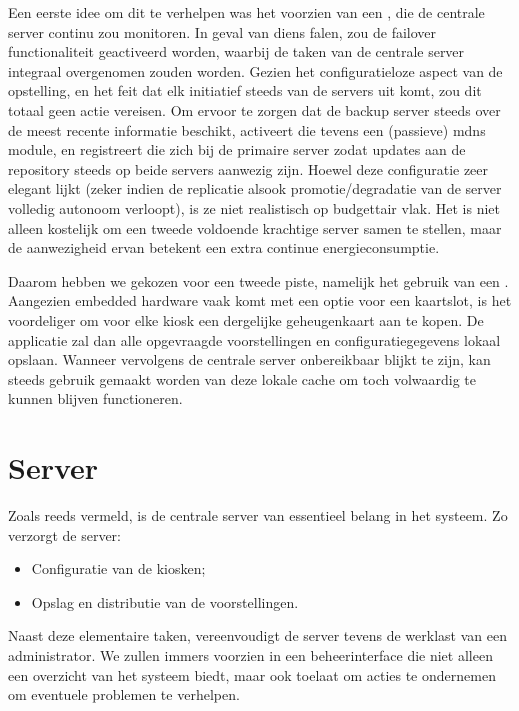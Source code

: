 Een eerste idee om dit te verhelpen was het voorzien van een , die de centrale server continu zou monitoren. In geval van diens falen, zou de failover functionaliteit geactiveerd worden, waarbij de taken van de centrale server integraal overgenomen zouden worden. Gezien het configuratieloze aspect van de opstelling, en het feit dat elk initiatief steeds van de servers uit komt, zou dit totaal geen actie vereisen. Om ervoor te zorgen dat de backup server steeds over de meest recente informatie beschikt, activeert die tevens een (passieve) \ac{mdns} module, en registreert die zich bij de primaire server zodat updates aan de repository steeds op beide servers aanwezig zijn.
Hoewel deze configuratie zeer elegant lijkt (zeker indien de replicatie alsook promotie/degradatie van de server volledig autonoom verloopt), is ze niet realistisch op budgettair vlak. Het is niet alleen kostelijk om een tweede voldoende krachtige server samen te stellen, maar de aanwezigheid ervan betekent een extra continue energieconsumptie.

Daarom hebben we gekozen voor een tweede piste, namelijk het gebruik van een . Aangezien embedded hardware vaak komt met een optie voor een kaartslot, is het voordeliger om voor elke kiosk een dergelijke geheugenkaart aan te kopen. De applicatie zal dan alle opgevraagde voorstellingen en configuratiegegevens lokaal opslaan. Wanneer vervolgens de centrale server onbereikbaar blijkt te zijn, kan steeds gebruik gemaakt worden van deze lokale cache om toch volwaardig te kunnen blijven functioneren.

\section{Server}
\label{ontwerp:applicatie:server}

Zoals reeds vermeld, is de centrale server van essentieel belang in het systeem. Zo verzorgt de server:
\begin{itemize}
\item Configuratie van de kiosken;
\item Opslag en distributie van de voorstellingen.
\end{itemize}

Naast deze elementaire taken, vereenvoudigt de server tevens de werklast van een administrator. We zullen immers voorzien in een beheerinterface die niet alleen een overzicht van het systeem biedt, maar ook toelaat om acties te ondernemen om eventuele problemen te verhelpen.

